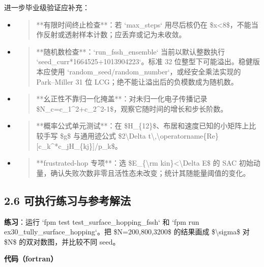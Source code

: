 \documentclass[UTF8,openany,11pt,fontset=fandol]{ctexbook}
\begin{document}
进一步毕业级验证应补充：

\begin{itemize}
\item
  \begin{quote}
  **有限时间终止检查**：若 `max\_steps` 用尽后核仍在
  \$\textbar x\textbar\textless8\textbar\$，不能当作反射或透射样本计数；应丢弃或记为未收敛。
  \end{quote}
\item
  \begin{quote}
  **随机数检查**：`run\_fssh\_ensemble` 当前以默认整数执行
  `seed\_curr*1664525+1013904223`。标准 32
  位整型下可能溢出。稳健版本应使用
  `random\_seed/random\_number`，或经安全乘法实现的 Park--Miller 31 位
  LCG；绝不能让溢出后的负模数成为随机数。
  \end{quote}
\item
  \begin{quote}
  **幺正性不靠归一化掩盖**：对未归一化电子传播记录
  \$N\_c=\textbar c\_1\textbar\^{}2+\textbar c\_2\textbar\^{}2-1\$，观察它随时间的增长和步长阶数。
  \end{quote}
\item
  \begin{quote}
  **概率公式单元测试**：在
  \$H\_\{12\}\$、布居和速度已知的小矩阵上比较手写 \$g\$ 与通用迹公式
  \$2\textbackslash Delta
  t\textbackslash,\textbackslash operatorname\{Re\}{[}c\_k\^{}*c\_jH\_\{kj\}{]}/p\_k\$。
  \end{quote}
\item
  \begin{quote}
  **frustrated-hop 专项**：选 \$E\_\{\textbackslash rm
  kin\}\textless\textbackslash Delta E\$ 的 SAC
  初始动量，确认失败次数非零且活性态未改变；统计其随能量阈值的变化。
  \end{quote}
\end{itemize}

\subsection{\texorpdfstring{\textbf{2.6
可执行练习与参考解法}}{2.6 可执行练习与参考解法}}\label{ux53efux6267ux884cux7ec3ux4e60ux4e0eux53c2ux8003ux89e3ux6cd5-1}

\textbf{练习}：运行 `fpm test test\_surface\_hopping\_fssh` 和 `fpm run
ex30\_tully\_surface\_hopping`。把 \$N=200,800,3200\$ 的结果画成
\$\textbackslash sigma\$ 对 \$N\$ 的双对数图，并比较不同 seed。

\textbf{代码（fortran）}
\end{document}
